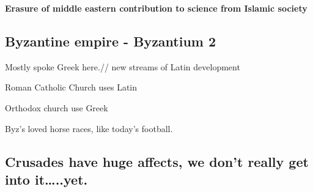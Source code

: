 \documentclass[11pt]{article}
\begin{document}
\textbf{Erasure of middle eastern contribution to science from Islamic society}

\subsection{Byzantine empire - Byzantium 2}
\label{sec-8-20}
Mostly spoke Greek here.//
new streams of Latin development

Roman Catholic Church uses Latin

Orthodox church use Greek

Byz's loved horse races, like today's football.

\subsection{Crusades have huge affects, we don't really get into it\ldots{}..yet.}
\label{sec-8-21}
\end{document}
